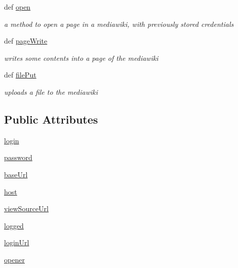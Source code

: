 \begin{DoxyCompactItemize}
\item 
def \hyperlink{classuicilibris_1_1mediawiki_1_1MediawikiOpener_a680b3f909d42e0653bd729147de7abb3}{open}
\begin{DoxyCompactList}\small\item\em a method to open a page in a mediawiki, with previously stored credentials \end{DoxyCompactList}\item 
def \hyperlink{classuicilibris_1_1mediawiki_1_1MediawikiOpener_a5fd1eba3c9b312751aea45ec64855bf8}{page\-Write}
\begin{DoxyCompactList}\small\item\em writes some contents into a page of the mediawiki \end{DoxyCompactList}\item 
def \hyperlink{classuicilibris_1_1mediawiki_1_1MediawikiOpener_ab225f66754680f599ded4666d1b693ac}{file\-Put}
\begin{DoxyCompactList}\small\item\em uploads a file to the mediawiki \end{DoxyCompactList}\end{DoxyCompactItemize}
\subsection*{\-Public \-Attributes}
\begin{DoxyCompactItemize}
\item 
\hyperlink{classuicilibris_1_1mediawiki_1_1MediawikiOpener_a5afcbcf2c8ac818afac97fe7ee817fa6}{login}
\item 
\hyperlink{classuicilibris_1_1mediawiki_1_1MediawikiOpener_a97ad770add035da198306aa2f4f2f610}{password}
\item 
\hyperlink{classuicilibris_1_1mediawiki_1_1MediawikiOpener_aca3ae7582d52993d0acd3fd78e887d2e}{base\-Url}
\item 
\hyperlink{classuicilibris_1_1mediawiki_1_1MediawikiOpener_ab452cfcb0733d955a38d6f4279788527}{host}
\item 
\hyperlink{classuicilibris_1_1mediawiki_1_1MediawikiOpener_a829823d3c04143f2c1a9cd9adcd74114}{view\-Source\-Url}
\item 
\hyperlink{classuicilibris_1_1mediawiki_1_1MediawikiOpener_a6f7e48cd8ca22fb1e51fd920c3da6609}{logged}
\item 
\hyperlink{classuicilibris_1_1mediawiki_1_1MediawikiOpener_a2a2d37c634ce31894dea8e4cc9f24d67}{login\-Url}
\item 
\hyperlink{classuicilibris_1_1mediawiki_1_1MediawikiOpener_a305fd0dc7e666278703813b5ac28f9cf}{opener}
\end{DoxyCompactItemize}


